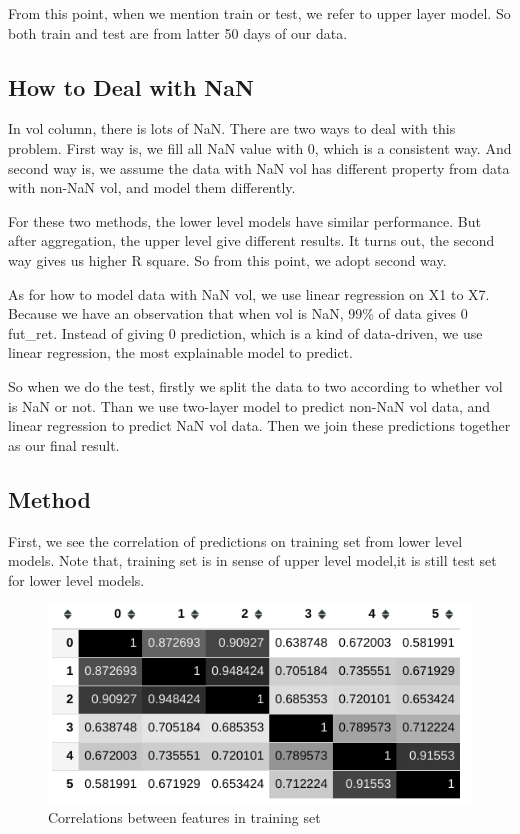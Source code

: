 \documentclass[onecolumn]{article}
\begin{document}
From this point, when we mention train or test, we refer to upper layer model. So both train and test are from latter 50 days of our data.


\subsection{How to Deal with NaN}
In vol column, there is lots of NaN. There are two ways to deal with this problem. First way is, we fill all NaN value with 0, which is a consistent way. And second way is, we assume the data with NaN vol has different property from data with non-NaN vol, and model them differently.

For these two methods, the lower level models have similar performance. But after aggregation, the upper level give different results. It turns out, the second way gives us higher R square. So from this point, we adopt second way.

As for how to model data with NaN vol, we use linear regression on X1 to X7. Because we have an observation that when vol is NaN, 99\% of data gives 0 fut\_ret. Instead of giving 0 prediction, which is a kind of data-driven, we use linear regression, the most explainable model to predict.

So when we do the test, firstly we split the data to two according to whether vol is NaN or not. Than we use two-layer model to predict non-NaN vol data, and linear regression to predict NaN vol data. Then we join these predictions together as our final result.


\subsection{Method}
First, we see the correlation of predictions on training set from lower level models. Note that, training set is in sense of upper level model,it is still test set for lower level models.


\begin{figure}[ht]
    \centering
    \includegraphics[scale=0.8]{agg_1.png}
    \caption{Correlations between features in training set}
    \label{fig:label}
\end{figure}
\end{document}
